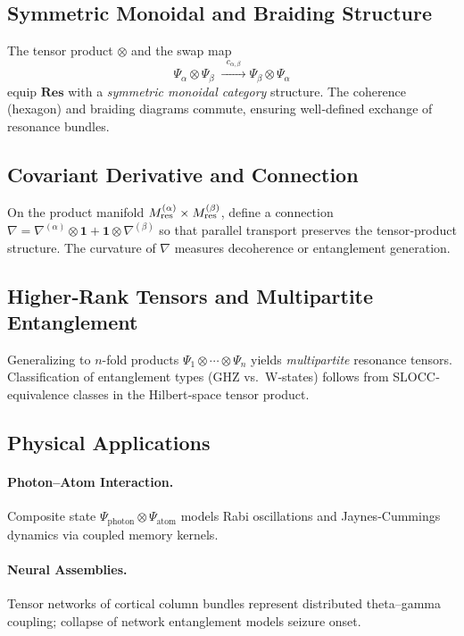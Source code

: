 \subsection{Symmetric Monoidal and Braiding Structure}

The tensor product \(\otimes\) and the swap map
\[
  \Psi_{\alpha}\otimes\Psi_{\beta}
  \;\xrightarrow{\;\;c_{\alpha,\beta}\;\;}
  \Psi_{\beta}\otimes\Psi_{\alpha}
\]
equip \(\mathbf{Res}\) with a \emph{symmetric monoidal category} structure.  The coherence (hexagon) and braiding diagrams commute, ensuring well‐defined exchange of resonance bundles.

\subsection{Covariant Derivative and Connection}

On the product manifold \(M_{\rm res}^{(\alpha)}\times M_{\rm res}^{(\beta)}\), define a connection
\(\nabla = \nabla^{(\alpha)}\otimes\mathbf{1} + \mathbf{1}\otimes\nabla^{(\beta)}\)
so that parallel transport preserves the tensor‐product structure.  The curvature of \(\nabla\) measures decoherence or entanglement generation.

\subsection{Higher‐Rank Tensors and Multipartite Entanglement}

Generalizing to \(n\)-fold products \(\Psi_{1}\otimes\cdots\otimes\Psi_{n}\) yields \emph{multipartite} resonance tensors.  Classification of entanglement types (GHZ vs.\ W‐states) follows from SLOCC‐equivalence classes in the Hilbert‐space tensor product.

\subsection{Physical Applications}

\paragraph{Photon–Atom Interaction.}  
Composite state \(\Psi_{\mathrm{photon}}\otimes\Psi_{\mathrm{atom}}\) models Rabi oscillations and Jaynes‐Cummings dynamics via coupled memory kernels.

\paragraph{Neural Assemblies.}  
Tensor networks of cortical column bundles represent distributed theta–gamma coupling; collapse of network entanglement models seizure onset.

